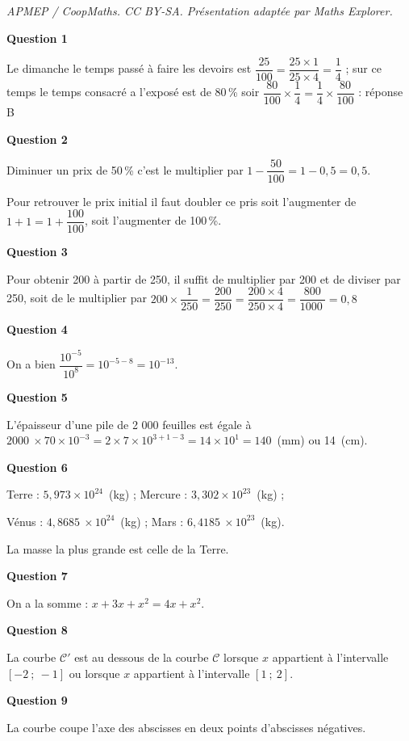 \documentclass[10pt]{article}
\providecommand{\np}[2][]{{#2~#1}}
\begin{document}
\noindent\textit{APMEP / CoopMaths. CC BY-SA. Présentation adaptée par Maths Explorer.}\par\medskip
\smallskip

\textbf{Question 1}

Le dimanche le temps passé à faire les devoirs est $\dfrac{25}{100} = \dfrac{25 \times 1}{25 \times 4} = \dfrac 14$ ; sur ce temps le temps consacré a l'exposé est de 80\,\% soir $\dfrac{80}{100} \times \dfrac 14 = \dfrac 14 \times \dfrac{80}{100}$ : réponse B

\textbf{Question 2}

Diminuer un prix de 50\,\% c'est le multiplier par $1 - \dfrac{50}{100} = 1 - 0,5 = 0,5$.

Pour retrouver le prix initial il faut doubler ce pris soit l'augmenter de $1 + 1 = 1 + \dfrac{100}{100}$, soit l'augmenter de 100\,\%.

\textbf{Question 3 }

Pour obtenir 200 à partir de 250, il suffit de multiplier par 200 et de diviser par 250, soit de le multiplier par $200 \times \dfrac{1}{250} = \dfrac{200}{250} = \dfrac{200 \times 4}{250 \times 4} = \dfrac{800}{\np{1000}} = 0,8$

\textbf{Question 4}

On a bien $\dfrac{10^{-5}}{10^{8}} = 10^{-5 - 8} = 10^{- 13}$.

\textbf{Question 5}

L'épaisseur d'une pile de 2 000 feuilles est égale à $\np{2000} \times 70 \times 10^{-3} = 2 \times 7 \times 10^{3 + 1 -3} = 14 \times 10^{1} = 140$~(mm) ou 14~(cm).

\textbf{Question 6}

Terre : $5,973 \times 10^{24}$~(kg) ; Mercure : $3,302 \times 10^{23}$~(kg) ;

Vénus : $\np{4,8685} \times 10^{24}$~(kg) ; Mars : $\np{6,4185} \times 10^{23}$~(kg).

La masse la plus grande est celle de la Terre.

\textbf{Question 7}

On a la somme : $x + 3x + x^2 = 4x + x^2$.

\textbf{Question 8}

La courbe $\mathcal{C}'$ est au dessous de la courbe $\mathcal{C}$ lorsque $x$ appartient à l'intervalle $[-2~;~-1]$ ou lorsque $x$ appartient à l'intervalle $[1~;~2]$.

\textbf{Question 9}

La courbe coupe l'axe des abscisses en deux points d'abscisses négatives.
\end{document}
